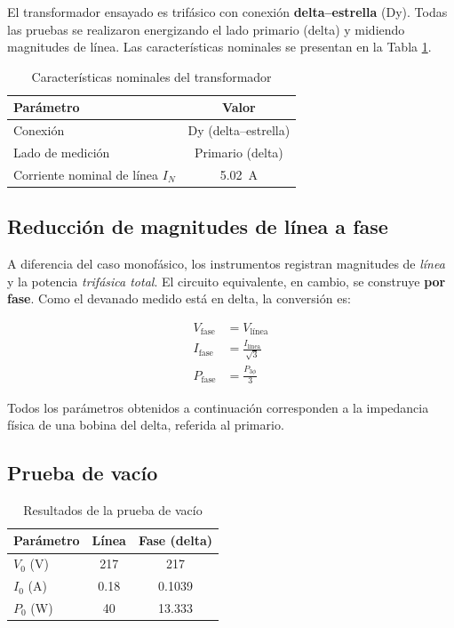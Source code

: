 \documentclass[conference]{IEEEtran}
\begin{document}
El transformador ensayado es trifásico con conexión \textbf{delta--estrella} (Dy).
Todas las pruebas se realizaron energizando el lado primario (delta) y midiendo
magnitudes de línea. Las características nominales se presentan en la
Tabla \ref{tab:placa_transformador}.

\begin{table}[H]
\centering
\begin{tabular}{|l|c|}
\hline
\textbf{Parámetro} & \textbf{Valor} \\ \hline
Conexión & Dy (delta--estrella) \\ \hline
Lado de medición & Primario (delta) \\ \hline
Corriente nominal de línea $I_N$ & 5.02~A \\ \hline
\end{tabular}
\caption{Características nominales del transformador}
\label{tab:placa_transformador}
\end{table}

\subsection{Reducción de magnitudes de línea a fase}

A diferencia del caso monofásico, los instrumentos registran magnitudes de
\textit{línea} y la potencia \textit{trifásica total}. El circuito equivalente,
en cambio, se construye \textbf{por fase}. Como el devanado medido está en delta,
la conversión es:

\begin{align}
V_{\text{fase}} &= V_{\text{línea}} \\
I_{\text{fase}} &= \frac{I_{\text{línea}}}{\sqrt{3}} \\
P_{\text{fase}} &= \frac{P_{3\phi}}{3}
\end{align}

Todos los parámetros obtenidos a continuación corresponden a la impedancia física de una bobina del delta, referida al primario.

\subsection{Prueba de vacío}

\begin{table}[H]
\centering
\begin{tabular}{|l|c|c|}
\hline
\textbf{Parámetro} & \textbf{Línea} & \textbf{Fase (delta)} \\ \hline
$V_0$ (V) & 217 & 217 \\ \hline
$I_0$ (A) & 0.18 & 0.1039 \\ \hline
$P_0$ (W) & 40 & 13.333 \\ \hline
\end{tabular}
\caption{Resultados de la prueba de vacío}
\label{tab:vacio}
\end{table}
\end{document}
